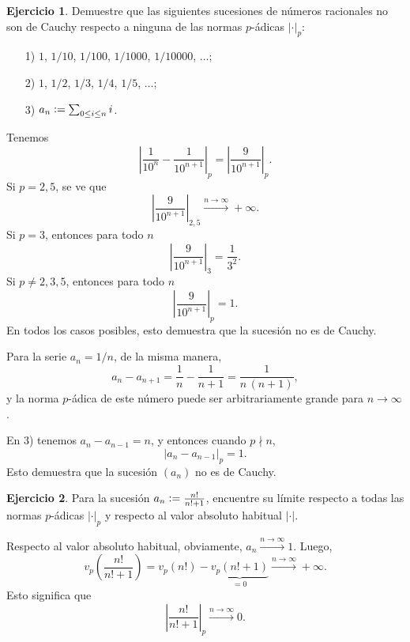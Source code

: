 \documentclass{article}
\numberwithin{equation}{section}
\theoremstyle{definition}
\newtheorem{ejerc}{Ejercicio}
\begin{document}
\begin{ejerc}
  \label{ejerc:1/10n-respecto-a-norma-p-adica}
  Demuestre que las siguientes sucesiones de números racionales no son de Cauchy
  respecto a ninguna de las normas $p$-ádicas $|\cdot|_p$:

  \begin{enumerate}
  \item[1)] $1$, $1/10$, $1/100$, $1/1000$, $1/10000$, $\ldots$;

  \item[2)] $1$, $1/2$, $1/3$, $1/4$, $1/5$, $\ldots$;

  \item[3)] $a_n \mathrel{\mathop:}= \sum_{0\le i \le n} i$.
  \end{enumerate}

  \ifdefined\solutions\begin{solucion}
    Tenemos
    \[ \left|\frac{1}{10^n} - \frac{1}{10^{n+1}}\right|_p =
       \left|\frac{9}{10^{n+1}}\right|_p. \]
    Si $p = 2, 5$, se ve que
    $$\left|\frac{9}{10^{n+1}}\right|_{2,5} \xrightarrow{n\to\infty} +\infty.$$
    Si $p = 3$, entonces para todo $n$
    $$\left|\frac{9}{10^{n+1}}\right|_3 = \frac{1}{3^2}.$$
    Si $p\ne 2, 3, 5$, entonces para todo $n$
    $$\left|\frac{9}{10^{n+1}}\right|_p = 1.$$
    En todos los casos posibles, esto demuestra que la sucesión no es de Cauchy.

    Para la serie $a_n = 1/n$, de la misma manera,
    $$a_n - a_{n+1} = \frac{1}{n} - \frac{1}{n+1} = \frac{1}{n\,(n+1)},$$
    y la norma $p$-ádica de este número puede ser arbitrariamente grande para
    $n\to\infty$.

    En 3) tenemos $a_n - a_{n-1} = n$, y entonces cuando $p\nmid n$,
    $$|a_n - a_{n-1}|_p = 1.$$
    Esto demuestra que la sucesión $(a_n)$ no es de Cauchy.
  \end{solucion}\fi
\end{ejerc}

\begin{ejerc}
  Para la sucesión $a_n \mathrel{\mathop:}= \frac{n!}{n! + 1}$, encuentre su límite respecto
  a todas las normas $p$-ádicas $|\cdot|_p$ y respecto al valor absoluto
  habitual $|\cdot|$.

  \ifdefined\solutions\begin{solucion}
    Respecto al valor absoluto habitual, obviamente,
    $a_n \xrightarrow{n\to\infty} 1$. Luego,
    \[ v_p \left(\frac{n!}{n! + 1}\right) =
       v_p (n!) - \underbrace{v_p (n! + 1)}_{= 0}
       \xrightarrow{n\to\infty} +\infty. \]
    Esto significa que
    $$\left|\frac{n!}{n! + 1}\right|_p \xrightarrow{n\to\infty} 0.$$
  \end{solucion}\fi
\end{ejerc}
\end{document}
